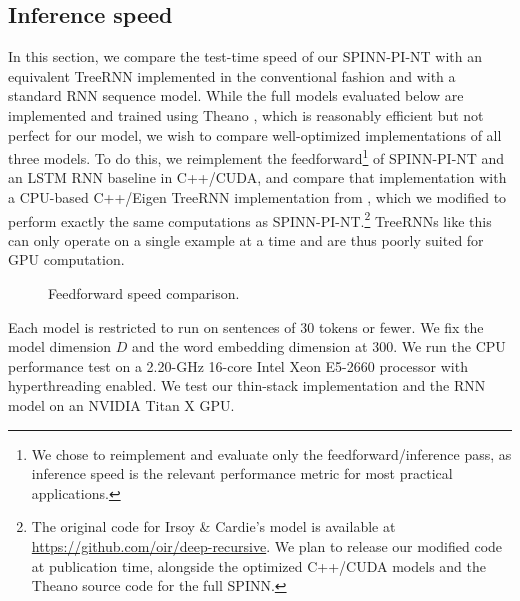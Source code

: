 \documentclass[11pt]{article}
\begin{document}
\subsection{Inference speed}
\label{sec:speed}

In this section, we compare the test-time speed of our SPINN-PI-NT with an equivalent TreeRNN implemented in the conventional fashion and with a standard RNN sequence model. While the full models evaluated below are implemented and trained using Theano \citep{bergstra+al:2010-scipy,Bastien-Theano-2012}, which is reasonably efficient but not perfect for our model, we wish to compare well-optimized implementations of all three models. To do this, we reimplement the feedforward\footnote{We chose to reimplement and evaluate only the feedforward/inference pass, as inference speed is the relevant performance metric for most practical applications.} of SPINN-PI-NT and an LSTM RNN baseline in C++/CUDA, and compare that implementation with a CPU-based C++/Eigen TreeRNN implementation from \citet{irsoy2014deep}, which we modified to perform exactly the same computations as SPINN-PI-NT.\footnote{The original code for Irsoy \& Cardie's model is available at \url{https://github.com/oir/deep-recursive}. We plan to release our modified code at publication time, alongside the optimized C++/CUDA models and the Theano source code for the full SPINN.} TreeRNNs like this can only operate on a single example at a time and are thus poorly suited for GPU computation.

\begin{figure}
\centering
{}
\caption{Feedforward speed comparison.}
\label{fig:speed}
\end{figure}


Each model is restricted to run on sentences of 30 tokens or fewer. We fix the model dimension $D$ and the word embedding dimension at 300. We run the CPU performance test on a 2.20-GHz 16-core Intel Xeon E5-2660 processor with hyperthreading enabled. We test our thin-stack implementation and the RNN model on an NVIDIA Titan X GPU.
\end{document}
